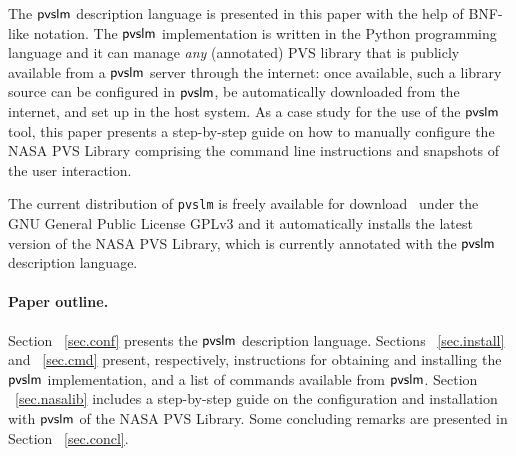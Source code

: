 The $\textsf{pvslm}$ description language is presented in this paper with the
help of BNF-like notation. The $\textsf{pvslm}$ implementation is written in
the Python programming language and it can manage {\em any}
(annotated) PVS library that is publicly available from a $\textsf{pvslm}$
server through the internet: once available, such a library source can
be configured in $\textsf{pvslm}$, be automatically downloaded from the
internet, and set up in the host system. As a case study for the use
of the $\textsf{pvslm}$ tool, this paper presents a step-by-step guide on how
to manually configure the NASA PVS Library comprising the command line
instructions and snapshots of the user interaction.

The current distribution of \verb$pvslm$ is freely available for
download~\cite{pvslm} under the GNU General Public License GPLv3 and
it automatically installs the latest version of the NASA PVS Library,
which is currently annotated with the $\textsf{pvslm}$ description language.

\paragraph{Paper outline.} Section ~\ref{sec.conf} presents the $\textsf{pvslm}$ 
description language. Sections ~\ref{sec.install} and ~\ref{sec.cmd} 
present, respectively, instructions for obtaining and installing the $\textsf{pvslm}$ 
implementation, and a list of commands available from $\textsf{pvslm}$. 
Section ~\ref{sec.nasalib} includes a step-by-step guide on the configuration and
installation with $\textsf{pvslm}$ of the NASA PVS Library. Some concluding
remarks are presented in Section ~\ref{sec.concl}.
